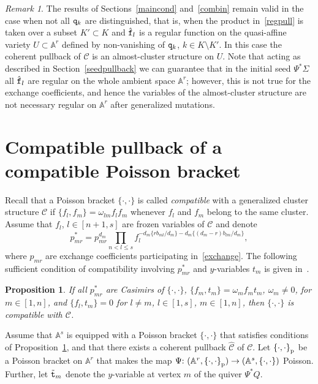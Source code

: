 \documentclass{amsart}
\newtheorem{proposition}[theorem]{Proposition}
\theoremstyle{definition}
\theoremstyle{remark}
\newtheorem{remark}[theorem]{Remark}
\numberwithin{equation}{section}
\numberwithin{theorem}{section}
\def\AA{{\mathbb A}}
\def\CC{{\mathcal C}}
\def\ttf{{\tt f}}
\def\ttq{{\tt q}}
\def\ttt{{\tt t}}
\def\Poi{{\{\cdot,\cdot\}}}
\def\Poip{\Poi_{\rm p}}
\def\:{{:\ }}
\begin{document}
\begin{remark}
The results of Sections~\ref{maincond} and~\ref{combin} remain valid in the case when not all $\ttq_k$ are distinguished, that is, when the product in~\eqref{regpull} is taken over a subset $K'\subset K$ and $\hat\ttf_l$ is a regular function on the  quasi-affine variety $U\subset\AA^r$ defined by non-vanishing of $\ttq_k$, $k\in K\setminus K'$.
In this case the coherent pullback of $\CC$ is an almost-cluster structure on $U$. Note that acting as described in Section~\ref{seedpullback} we can guarantee that in the initial seed $\Psi^*\widehat\Sigma$ all $\hat\ttf_l$ are regular on the whole ambient space $\AA^{r}$; however, this is not true for the exchange coefficients, and hence the variables of the almost-cluster structure are not necessary regular on $\AA^{r}$ after generalized mutations. 
\end{remark}

\section{Compatible pullback of a compatible Poisson bracket}\label{poisson}
Recall that a Poisson bracket $\Poi$ is called {\it compatible\/} with a generalized cluster structure $\CC$ if
$\{f_l,f_m\}=\omega_{lm}f_lf_m$ whenever $f_l$ and $f_m$ belong to the same cluster. Assume that $f_l$, $l\in[n+1,s]$ are frozen variables of $\CC$ and denote 
\[
p_{mr}^*=p_{mr}^{d_m}\prod_{n<l\le s}f_l^{-d_m\{rb_{ml}/d_m\}-d_m\{(d_m-r)b_{lm}/d_m\}},
\]
where $p_{mr}$ are exchange coefficients participating in~\eqref{exchange}. The following sufficient condition of compatibility involving $p_{mr}^*$ and $y$-variables $t_m$ is given in~\cite[Proposition~2.5]{GSVdouble}.

\begin{proposition}\label{combracond}
If all $p_{mr}^*$ are Casimirs of $\Poi$, $\{f_m,t_m\}=\omega_m f_mt_m$, $\omega_m\ne0$, for $m\in[1,n]$, 
and $\{f_l,t_m\}=0$ for $l\ne m$, $l\in[1,s]$, $m\in[1,n]$, then $\Poi$ is compatible with $\CC$.
\end{proposition}

Assume that $\AA^s$ is equipped with a Poisson bracket $\Poi$ that satisfies conditions of 
Proposition~\ref{combracond}, and that there exists a coherent pullback $\widehat\CC$ of $\CC$. Let $\Poip$ be a Poisson bracket on $\AA^r$ that makes the map $\Psi\: (\AA^r,\Poip)\to (\AA^s,\Poi)$ Poisson. Further, let $\tilde\ttt_m$ denote the $y$-variable at vertex $m$ of the quiver $\Psi^*Q$.
\end{document}
